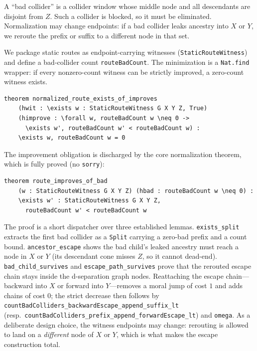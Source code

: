 \documentclass[acmsmall,screen,nonacm]{acmart}
\newcommand{\lean}[1]{\lstinline!#1!}
\begin{document}
A ``bad collider'' is a collider window whose middle node and all descendants are
disjoint from $Z$.  Such a collider is blocked, so it must be eliminated.  Normalization may change endpoints: if a bad collider leaks
ancestry into $X$ or $Y$, we reroute the prefix or suffix to a different node in
that set.

We package static routes as endpoint-carrying witnesses
(\lean{StaticRouteWitness}) and define a bad-collider count \lean{routeBadCount}.
The minimization is a \lean{Nat.find} wrapper: if every nonzero-count witness can
be strictly improved, a zero-count witness exists.

\begin{lstlisting}[caption={Bad-collider minimization wrapper}]
theorem normalized_route_exists_of_improves
    (hwit : \exists w : StaticRouteWitness G X Y Z, True)
    (himprove : \forall w, routeBadCount w \neq 0 ->
      \exists w', routeBadCount w' < routeBadCount w) :
    \exists w, routeBadCount w = 0
\end{lstlisting}

The improvement obligation is discharged by the core normalization theorem,
which is fully proved (no \lean{sorry}):

\begin{lstlisting}[caption={Strict improvement for non-normalized routes}]
theorem route_improves_of_bad
    (w : StaticRouteWitness G X Y Z) (hbad : routeBadCount w \neq 0) :
    \exists w' : StaticRouteWitness G X Y Z,
      routeBadCount w' < routeBadCount w
\end{lstlisting}

The proof is a short dispatcher over three established lemmas.
\lean{exists_split} extracts the first bad collider as a \lean{Split} carrying a
zero-bad prefix and a count bound.  \lean{ancestor_escape} shows the bad child's
leaked ancestry must reach a node in $X$ or $Y$ (its descendant cone misses
$Z$, so it cannot dead-end).  \lean{bad_child_survives} and
\lean{escape_path_survives} prove that the rerouted escape chain stays inside
the d-separation graph nodes.  Reattaching the escape chain---backward into $X$
or forward into $Y$---removes a moral jump of cost $1$ and adds chains of cost
$0$; the strict decrease then follows by
\texttt{countBadColliders\_backwardEscape\_}\allowbreak\texttt{append\_suffix\_lt} (resp.\
\texttt{countBadColliders\_prefix\_append\_}\allowbreak\texttt{forwardEscape\_lt}) and \lean{omega}.  As a
deliberate design choice, the witness endpoints may change: rerouting is allowed
to land on a \emph{different} node of $X$ or $Y$, which is what makes the escape
construction total.
\end{document}
